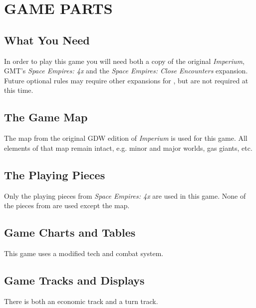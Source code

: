 \section{GAME PARTS}

\subsection{What You Need}

In order to play this game you will need both a copy of the original \textit{Imperium}, GMT's \textit{Space Empires: 4x} and the \textit{Space Empires: Close Encounters} expansion. Future optional rules may require other expansions for , but are not required at this time.

\subsection{The Game Map}

The map from the original GDW edition of \textit{Imperium} is used for this game. All elements of that map remain intact, e.g. minor and major worlds, gas giants, etc.

\subsection{The Playing Pieces}

Only the playing pieces from \textit{Space Empires: 4x} are used in this game. None of the pieces from  are used except the map.

\subsection{Game Charts and Tables}

This game uses a modified tech and combat system.

\subsection{Game Tracks and Displays}

There is both an economic track and a turn track.